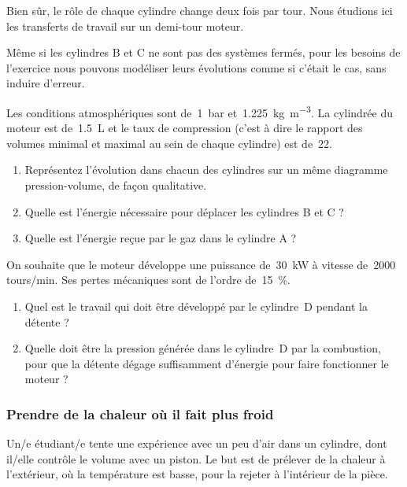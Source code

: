		Bien sûr, le rôle de chaque cylindre change deux fois par tour. Nous étudions ici les transferts de travail sur un demi-tour moteur.

		Même si les cylindres B et C ne sont pas des systèmes fermés, pour les besoins de l’exercice nous pouvons modéliser leurs évolutions comme si c’était le cas, sans induire d’erreur.

		Les conditions atmosphériques sont de~\SI{1}{\bar} et~\SI{1,225}{\kilogram\per\metre\cubed}.	La cylindrée du moteur est de~\SI{1,5}{\liter} et le taux de compression (c’est à dire le rapport des volumes minimal et maximal au sein de chaque cylindre) est de~\num{22}.
		
		\begin{enumerate}
			\item Représentez l’évolution dans chacun des cylindres sur un même diagramme pression-volume, de façon qualitative.
			\item Quelle est l’énergie nécessaire pour déplacer les cylindres B et C ?
			\item Quelle est l’énergie reçue par le gaz dans le cylindre A ?
		\end{enumerate}
		
		On souhaite que le moteur développe une puissance de~\SI{30}{\kilo\watt} à vitesse de~\num{2000} \si{tours/min}. Ses pertes mécaniques sont de l’ordre de~\SI{15}{\percent}.
		
		\begin{enumerate}
			\item Quel est le travail qui doit être développé par le cylindre~D pendant la détente ?
			\item Quelle doit être la pression générée dans le cylindre~D par la combustion, pour que la détente dégage suffisamment d’énergie pour faire fonctionner le moteur ?
		\end{enumerate}



\subsubsection{Prendre de la chaleur où il fait plus froid}
\label{exo_prendre_de_la_chaleur}

	Un/e étudiant/e tente une expérience avec un peu d’air dans un cylindre, dont il/elle contrôle le volume avec un piston. Le but est de prélever de la chaleur à l’extérieur, où la température est basse, pour la rejeter à l’intérieur de la pièce.

